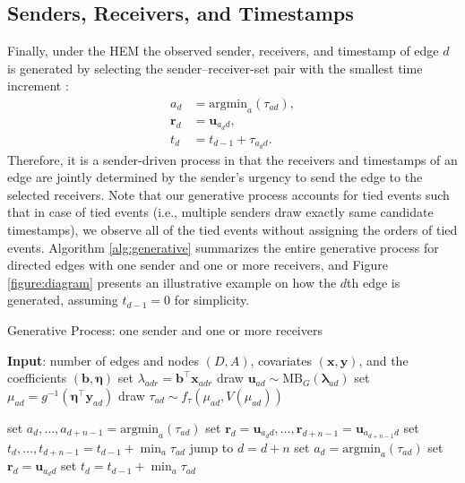 \documentclass[ba]{imsart}
\def\spacingset#1{\renewcommand{\baselinestretch}%
	{#1}\small\normalsize} \spacingset{1}
\numberwithin{equation}{section}
\theoremstyle{plain}
\begin{document}
\subsection{Senders, Receivers, and Timestamps}\label{subsec:Observed}
Finally, under the HEM the observed sender, receivers, and timestamp of edge $d$ is generated by selecting the sender--receiver-set pair with the smallest time increment \citep{snijders1996stochastic}:
\begin{equation}
\begin{aligned}
a_d &= \mbox{argmin}_{a}(\tau_{ad}),\\
\boldsymbol{r}_d &= \boldsymbol{u}_{a_d d},\\
t_d &=t_{d-1} + \tau_{a_d d}.
\end{aligned}
\end{equation}
Therefore, it is a sender-driven process in that the receivers and timestamps of an edge are jointly determined by the sender's urgency to send the edge to the selected receivers. Note that our generative process accounts for tied events such that in case of tied events (i.e., multiple senders draw exactly same candidate timestamps), we observe all of the tied events without assigning the orders of tied events. Algorithm \ref{alg:generative} summarizes the entire generative process for directed edges with one sender and one or more receivers, and Figure \ref{figure:diagram} presents an illustrative example on how the $d$th edge is generated, assuming $t_{d-1} = 0$ for simplicity.
	\begin{algorithm}[!t]
		\spacingset{1}
			\SetAlgoLined
		\caption{Generative Process: one sender and one or more receivers}
		\begin{algorithmic}
				\STATE \textbf{Input}: number of edges and nodes $(D, A)$, covariates $(\boldsymbol{x}, \boldsymbol{y})$, and the coefficients $(\boldsymbol{b}, \boldsymbol{\eta})$
				\vskip 0.1in
			\STATE	set $\lambda_{adr} = {\boldsymbol{b}}^{\top}\boldsymbol{x}_{adr}$
			\ENDFOR
			\STATE	draw $\boldsymbol{u}_{ad}  \sim
			\mbox{MB}_G(\boldsymbol{\lambda}_{ad})$
			\STATE		set $\mu_{ad} = g^{-1}(\boldsymbol{\eta}^\top \boldsymbol{y}_{ad})$
			\STATE		draw $\tau_{ad} \sim f_\tau(\mu_{ad}, V(\mu_{ad}))$
			\ENDFOR
		
			\STATE	set $a_d, \ldots, a_{d+n-1}= \mbox{argmin}_{a}(\tau_{ad})$
			\STATE	set $\boldsymbol{r}_d=\boldsymbol{u}_{a_d d},\ldots,\boldsymbol{r}_{d+n-1}=\boldsymbol{u}_{a_{d+n-1} d}$
			\STATE	set $t_d, \ldots, t_{d+n-1}=t_{d-1} + \min_a\tau_{ad}$
			\STATE		jump to $d = d+n$
				\ELSE
				\STATE	set $a_d= \mbox{argmin}_{a}(\tau_{ad})$
				\STATE		set $\boldsymbol{r}_d = \boldsymbol{u}_{a_d d}$
				\STATE	set $t_d =t_{d-1} + \min_a\tau_{ad}$
				\ENDIF
			\ENDFOR
		\end{algorithmic}
		\label{alg:generative}
	\end{algorithm}
\end{document}
